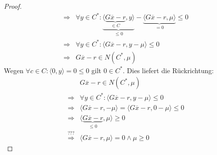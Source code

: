 \begin{proof}
\begin{align*}
\Rightarrow&\forall y\in C^*:\underbrace{\langle \underbrace{G\overline x-r}_{\in C},y\rangle}_{\leq 0}-\underbrace{\langle G\overline x-r,\mu\rangle}_{=0}\leq 0\\
\Rightarrow&\forall y\in C^*:\langle G\overline x-r,y-\mu\rangle\leq 0\\
\Rightarrow& G\overline x-r\in N(C^*,\mu)
\end{align*}
Wegen $\forall c\in C: \langle 0,y\rangle=0\leq 0$ gilt $0\in C^*$. Dies liefert die Rückrichtung:
\begin{align*}&G\overline x-r\in N(C^*,\mu)\\
\Rightarrow&\forall y\in C^*:\langle G\overline x-r,y-\mu\rangle\leq 0\\
\Rightarrow&\langle G\overline x-r,-\mu\rangle=\langle G\overline x-r,0-\mu\rangle\leq 0\\
\Rightarrow&\langle \underbrace{G\overline x-r}_{\leq 0},\mu\rangle\geq 0\\
\overset{???}\Rightarrow& \langle G\overline x-r,\mu\rangle=0\land \mu\geq 0
\end{align*}
\end{proof}